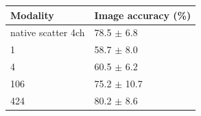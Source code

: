 \begin{tabular}{ll}
\toprule
Modality & Image accuracy (\%) \\
\midrule
native scatter 4ch & 78.5 $\pm$ 6.8 \\
1 & 58.7 $\pm$ 8.0 \\
4 & 60.5 $\pm$ 6.2 \\
106 & 75.2 $\pm$ 10.7 \\
424 & 80.2 $\pm$ 8.6 \\
\bottomrule
\end{tabular}
